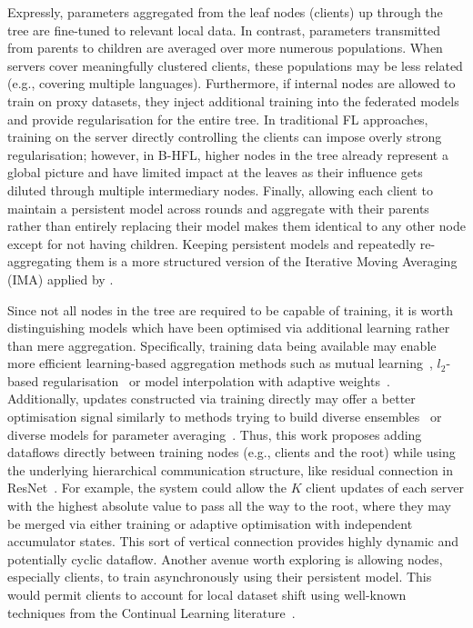 Expressly, parameters aggregated from the leaf nodes (clients) up through the tree are fine-tuned to relevant local data. In contrast, parameters transmitted from parents to children are averaged over more numerous populations. When servers cover meaningfully clustered clients, these populations may be less related (e.g., covering multiple languages). Furthermore, if internal nodes are allowed to train on proxy datasets, they inject additional training into the federated models and provide regularisation for the entire tree. In traditional FL approaches, training on the server directly controlling the clients can impose overly strong regularisation; however, in B-HFL, higher nodes in the tree already represent a global picture and have limited impact at the leaves as their influence gets diluted through multiple intermediary nodes. Finally, allowing each client to maintain a persistent model across rounds and aggregate with their parents rather than entirely replacing their model makes them identical to any other node except for not having children. Keeping persistent models and repeatedly re-aggregating them is a more structured version of the Iterative Moving Averaging (IMA) applied by \citet{UnderstandingModelAveragingInFL}.

Since not all nodes in the tree are required to be capable of training, it is worth distinguishing models which have been optimised via additional learning rather than mere aggregation. Specifically, training data being available may enable more efficient learning-based aggregation methods such as mutual learning~\citep{DeepMutualLearning}, $l_2$-based regularisation~\citep{Ditto} or model interpolation with adaptive weights~\citep{AdaptivePersonalisedFederatedLearning,ThreeApproachesMansour}. Additionally, updates constructed via training directly may offer a better optimisation signal similarly to methods trying to build diverse ensembles~\citep{StochasticMultipleChoiceLearningDiverseEnsembles} or diverse models for parameter averaging~\citep{DiverseWeightAveraging}. Thus, this work proposes adding dataflows directly between training nodes (e.g., clients and the root) while using the underlying hierarchical communication structure, like residual connection in ResNet~\citep{ResNet}. For example, the system could allow the $K$ client updates of each server with the highest absolute value to pass all the way to the root, where they may be merged via either training or adaptive optimisation with independent accumulator states. This sort of vertical connection provides highly dynamic and potentially cyclic dataflow. Another avenue worth exploring is allowing nodes, especially clients, to train asynchronously using their persistent model. This would permit clients to account for local dataset shift using well-known techniques from the Continual Learning literature~\citep{ContinualLearningSurvey,LearningWithoutForgetting,EWC}.

